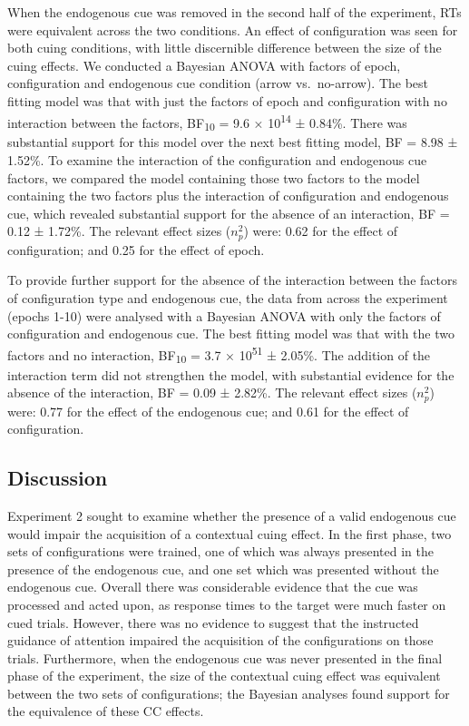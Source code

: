 \documentclass[
  man,
  floatsintext,
  longtable,
  nolmodern,
  notxfonts,
  notimes,
  colorlinks=true,linkcolor=blue,citecolor=blue,urlcolor=blue]{apa7}
\begin{document}
When the endogenous cue was removed in the second half of the
experiment, RTs were equivalent across the two conditions. An effect of
configuration was seen for both cuing conditions, with little
discernible difference between the size of the cuing effects. We
conducted a Bayesian ANOVA with factors of epoch, configuration and
endogenous cue condition (arrow vs.~no-arrow). The best fitting model
was that with just the factors of epoch and configuration with no
interaction between the factors, BF\textsubscript{10} = 9.6 ×
10\textsuperscript{14} ± 0.84\%. There was substantial support for this
model over the next best fitting model, BF = 8.98 ± 1.52\%. To examine
the interaction of the configuration and endogenous cue factors, we
compared the model containing those two factors to the model containing
the two factors plus the interaction of configuration and endogenous
cue, which revealed substantial support for the absence of an
interaction, BF = 0.12 ± 1.72\%. The relevant effect sizes (\(n^2_p\))
were: 0.62 for the effect of configuration; and 0.25 for the effect of
epoch.

To provide further support for the absence of the interaction between
the factors of configuration type and endogenous cue, the data from
across the experiment (epochs 1-10) were analysed with a Bayesian ANOVA
with only the factors of configuration and endogenous cue. The best
fitting model was that with the two factors and no interaction,
BF\textsubscript{10} = 3.7 × 10\textsuperscript{51} ± 2.05\%. The
addition of the interaction term did not strengthen the model, with
substantial evidence for the absence of the interaction, BF = 0.09 ±
2.82\%. The relevant effect sizes (\(n^2_p\)) were: 0.77 for the effect
of the endogenous cue; and 0.61 for the effect of configuration.

\subsection{Discussion}\label{discussion-1}

Experiment 2 sought to examine whether the presence of a valid
endogenous cue would impair the acquisition of a contextual cuing
effect. In the first phase, two sets of configurations were trained, one
of which was always presented in the presence of the endogenous cue, and
one set which was presented without the endogenous cue. Overall there
was considerable evidence that the cue was processed and acted upon, as
response times to the target were much faster on cued trials. However,
there was no evidence to suggest that the instructed guidance of
attention impaired the acquisition of the configurations on those
trials. Furthermore, when the endogenous cue was never presented in the
final phase of the experiment, the size of the contextual cuing effect
was equivalent between the two sets of configurations; the Bayesian
analyses found support for the equivalence of these CC effects.
\end{document}

